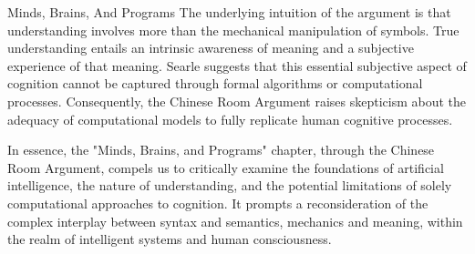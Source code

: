 \begin{notes}{Minds, Brains, And Programs}
    The underlying intuition of the argument is that understanding involves more than the mechanical manipulation of symbols. True understanding entails an intrinsic awareness of meaning and a subjective 
    experience of that meaning. Searle suggests that this essential subjective aspect of cognition cannot be captured through formal algorithms or computational processes. Consequently, the Chinese Room 
    Argument raises skepticism about the adequacy of computational models to fully replicate human cognitive processes.

    In essence, the "Minds, Brains, and Programs" chapter, through the Chinese Room Argument, compels us to critically examine the foundations of artificial intelligence, the nature of understanding, and 
    the potential limitations of solely computational approaches to cognition. It prompts a reconsideration of the complex interplay between syntax and semantics, mechanics and meaning, within the realm 
    of intelligent systems and human consciousness.
\end{notes}